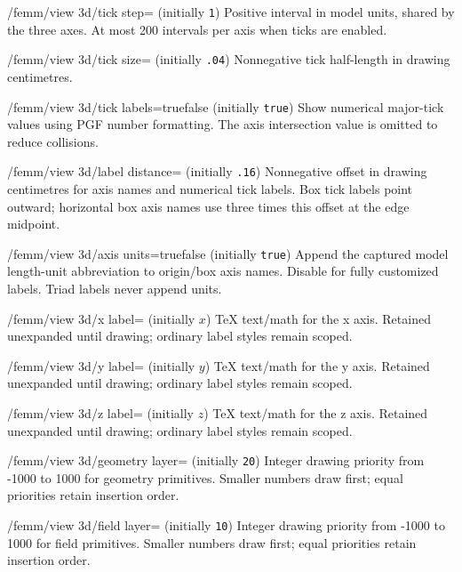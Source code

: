 \begin{key}{/femm/view 3d/tick step= (initially \texttt{1})}
Positive interval in model units, shared by the three axes. At most 200 intervals per axis when ticks are enabled.
\end{key}
\begin{key}{/femm/view 3d/tick size= (initially \texttt{.04})}
Nonnegative tick half-length in drawing centimetres.
\end{key}
\begin{key}{/femm/view 3d/tick labels=true\textbar false (initially \texttt{true})}
Show numerical major-tick values using PGF number formatting. The axis intersection value is omitted to reduce collisions.
\end{key}
\begin{key}{/femm/view 3d/label distance= (initially \texttt{.16})}
Nonnegative offset in drawing centimetres for axis names and numerical tick labels. Box tick labels point outward; horizontal box axis names use three times this offset at the edge midpoint.
\end{key}
\begin{key}{/femm/view 3d/axis units=true\textbar false (initially \texttt{true})}
Append the captured model length-unit abbreviation to origin/box axis names. Disable for fully customized labels. Triad labels never append units.
\end{key}
\begin{key}{/femm/view 3d/x label= (initially $x$)}
TeX text/math for the x axis. Retained unexpanded until drawing; ordinary label styles remain scoped.
\end{key}
\begin{key}{/femm/view 3d/y label= (initially $y$)}
TeX text/math for the y axis. Retained unexpanded until drawing; ordinary label styles remain scoped.
\end{key}
\begin{key}{/femm/view 3d/z label= (initially $z$)}
TeX text/math for the z axis. Retained unexpanded until drawing; ordinary label styles remain scoped.
\end{key}
\begin{key}{/femm/view 3d/geometry layer= (initially \texttt{20})}
Integer drawing priority from -1000 to 1000 for geometry primitives. Smaller numbers draw first; equal priorities retain insertion order.
\end{key}
\begin{key}{/femm/view 3d/field layer= (initially \texttt{10})}
Integer drawing priority from -1000 to 1000 for field primitives. Smaller numbers draw first; equal priorities retain insertion order.
\end{key}
